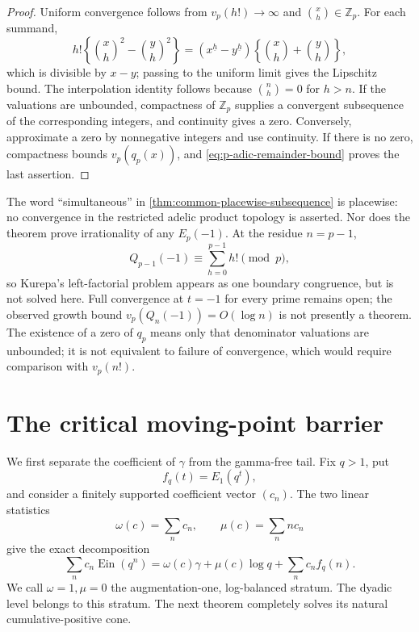 \documentclass[11pt]{article}
\theoremstyle{definition}
\theoremstyle{remark}
\newcommand{\Z}{\mathbb Z}
\newcommand{\Ein}{\operatorname{Ein}}
\begin{document}
\begin{proof}
Uniform convergence follows from \(v_p(h!)\to\infty\) and
\(\binom xh\in\Z_p\).  For each summand,
\[
 h!\left\{\binom xh^2-\binom yh^2\right\}
 =\left(x^{\underline h}-y^{\underline h}\right)
  \left\{\binom xh+\binom yh\right\},
\]
which is divisible by \(x-y\); passing to the uniform limit gives the
Lipschitz bound.  The interpolation identity follows because
\(\binom nh=0\) for \(h>n\).  If the valuations are unbounded, compactness
of \(\Z_p\) supplies a convergent subsequence of the corresponding integers,
and continuity gives a zero.  Conversely, approximate a zero by
nonnegative integers and use continuity.  If there is no zero, compactness
bounds \(v_p(q_p(x))\), and \eqref{eq:p-adic-remainder-bound} proves the
last assertion.
\end{proof}

The word ``simultaneous'' in \cref{thm:common-placewise-subsequence} is
placewise: no convergence in the restricted adelic product topology is
asserted.  Nor does the theorem prove irrationality of any \(E_p(-1)\).
At the residue \(n=p-1\),
\begin{equation}\label{eq:Kurepa-contact}
 Q_{p-1}(-1)\equiv\sum_{h=0}^{p-1}h!\pmod p,
\end{equation}
so Kurepa's left-factorial problem appears as one boundary congruence, but is
not solved here.  Full convergence at \(t=-1\) for every prime remains open;
the observed growth bound \(v_p(Q_n(-1))=O(\log n)\) is not presently a
theorem.  The existence of a zero of \(q_p\) means only that denominator
valuations are unbounded; it is not equivalent to failure of convergence,
which would require comparison with \(v_p(n!)\).

\section{The critical moving-point barrier}
\label{sec:barrier}

We first separate the coefficient of \(\gamma\) from the gamma-free tail.
Fix \(q>1\), put
\[
 f_q(t)=E_1(q^t),
\]
and consider a finitely supported coefficient vector \((c_n)\).  The two
linear statistics
\[
 \omega(c)=\sum_nc_n,
 \qquad
 \mu(c)=\sum_nnc_n
\]
give the exact decomposition
\begin{equation}\label{eq:augmentation-decomposition}
 \sum_nc_n\Ein(q^n)
 =\omega(c)\gamma+\mu(c)\log q+\sum_nc_nf_q(n).
\end{equation}
We call \(\omega=1,\mu=0\) the augmentation-one, log-balanced stratum.
The dyadic level belongs to this stratum.  The next theorem completely solves
its natural cumulative-positive cone.
\end{document}
